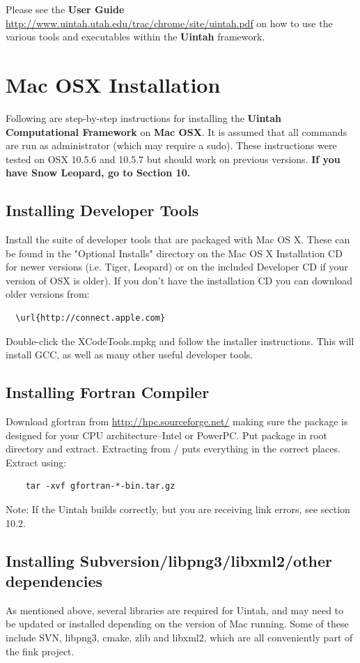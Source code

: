 \documentclass[12pt]{article}
\begin{document}
Please see the \textbf{User Guide}
\url{http://www.uintah.utah.edu/trac/chrome/site/uintah.pdf} on how to use
the various tools and executables within the \textbf{Uintah}
framework.

\section{Mac OSX Installation}

Following are step-by-step instructions for installing the
\textbf{Uintah Computational Framework} on \textbf{Mac OSX}.  It is
assumed that all commands are run as administrator (which may require
a sudo).  These instructions were tested on OSX 10.5.6 and 10.5.7 but
should work on previous versions.  \textbf{If you have Snow Leopard,
go to Section 10.}

\subsection{Installing Developer Tools}
Install the suite of developer tools that are packaged with Mac OS X.
These can be found in the "Optional Installs" directory on the Mac OS
X Installation CD for newer versions (i.e. Tiger, Leopard) or on the
included Developer CD if your version of OSX is older). If you don't
have the installation CD you can download older versions from:
\begin{verbatim}
  \url{http://connect.apple.com}
\end{verbatim}
 Double-click
the XCodeTools.mpkg and follow the installer instructions.  This will
install GCC, as well as many other useful developer tools.

\subsection{Installing Fortran Compiler}
Download gfortran from \url{http://hpc.sourceforge.net/} making sure
the package is designed for your CPU architecture--Intel or PowerPC.
Put package in root directory and extract.  Extracting from / puts
everything in the correct places.  Extract using:

\begin{verbatim}
	tar -xvf gfortran-*-bin.tar.gz
\end{verbatim}

Note: If the Uintah builds correctly, but you are receiving link errors, see section 10.2.

\subsection{Installing Subversion/libpng3/libxml2/other dependencies}
As mentioned above, several libraries are required for Uintah, and may
need to be updated or installed depending on the version of Mac
running.  Some of these include SVN, libpng3, cmake, zlib and libxml2,
which are all conveniently part of the fink project.
\end{document}
